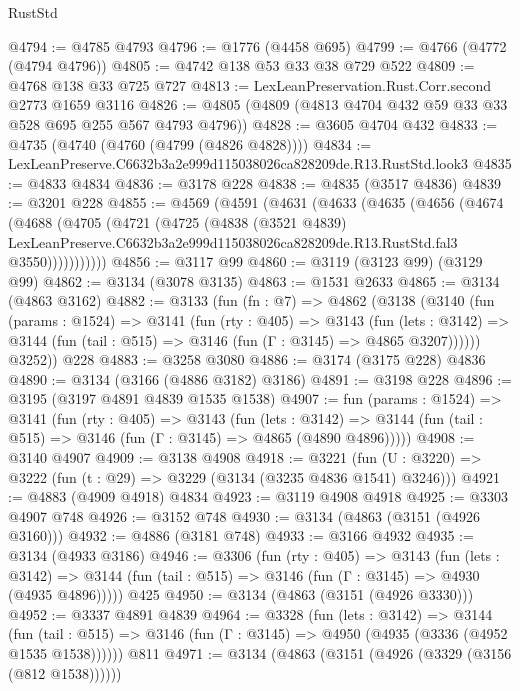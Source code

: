 \begin{lexlean}{RustStd}
\begin{coremodule}
@4794 := @4785 @4793
@4796 := @1776 (@4458 @695)
@4799 := @4766 (@4772 (@4794 @4796))
@4805 := @4742 @138 @53 @33 @38 @729 @522
@4809 := @4768 @138 @33 @725 @727
@4813 := LexLeanPreservation.Rust.Corr.second @2773 @1659 @3116
@4826 := @4805 (@4809 (@4813 @4704 @432 @59 @33 @33 @528 @695 @255 @567 @4793 @4796))
@4828 := @3605 @4704 @432
@4833 := @4735 (@4740 (@4760 (@4799 (@4826 @4828))))
@4834 := LexLeanPreserve.C6632b3a2e999d115038026ca828209de.R13.RustStd.look3
@4835 := @4833 @4834
@4836 := @3178 @228
@4838 := @4835 (@3517 @4836)
@4839 := @3201 @228
@4855 := @4569
    (@4591
      (@4631
        (@4633
          (@4635
            (@4656
              (@4674
                (@4688
                  (@4705
                    (@4721
                      (@4725
                        (@4838
                          (@3521 @4839)
                          LexLeanPreserve.C6632b3a2e999d115038026ca828209de.R13.RustStd.fal3
                          @3550)))))))))))
@4856 := @3117 @99
@4860 := @3119 (@3123 @99) (@3129 @99)
@4862 := @3134 (@3078 @3135)
@4863 := @1531 @2633
@4865 := @3134 (@4863 @3162)
@4882 := @3133
    (fun (fn : @7) =>
    @4862
      (@3138
        (@3140
          (fun (params : @1524) =>
          @3141
            (fun (rty : @405) =>
            @3143
              (fun (lets : @3142) =>
              @3144 (fun (tail : @515) => @3146 (fun (Γ : @3145) => @4865 @3207))))))
        @3252))
    @228
@4883 := @3258 @3080
@4886 := @3174 (@3175 @228) @4836
@4890 := @3134 (@3166 (@4886 @3182) @3186)
@4891 := @3198 @228
@4896 := @3195 (@3197 @4891 @4839 @1535 @1538)
@4907 := fun (params : @1524) =>
  @3141
    (fun (rty : @405) =>
    @3143
      (fun (lets : @3142) =>
      @3144 (fun (tail : @515) => @3146 (fun (Γ : @3145) => @4865 (@4890 @4896)))))
@4908 := @3140 @4907
@4909 := @3138 @4908
@4918 := @3221 (fun (U : @3220) => @3222 (fun (t : @29) => @3229 (@3134 (@3235 @4836 @1541) @3246)))
@4921 := @4883 (@4909 @4918) @4834
@4923 := @3119 @4908 @4918
@4925 := @3303 @4907 @748
@4926 := @3152 @748
@4930 := @3134 (@4863 (@3151 (@4926 @3160)))
@4932 := @4886 (@3181 @748)
@4933 := @3166 @4932
@4935 := @3134 (@4933 @3186)
@4946 := @3306
    (fun (rty : @405) =>
    @3143
      (fun (lets : @3142) =>
      @3144 (fun (tail : @515) => @3146 (fun (Γ : @3145) => @4930 (@4935 @4896)))))
    @425
@4950 := @3134 (@4863 (@3151 (@4926 @3330)))
@4952 := @3337 @4891 @4839
@4964 := @3328
    (fun (lets : @3142) =>
    @3144
      (fun (tail : @515) => @3146 (fun (Γ : @3145) => @4950 (@4935 (@3336 (@4952 @1535 @1538))))))
    @811
@4971 := @3134 (@4863 (@3151 (@4926 (@3329 (@3156 (@812 @1538))))))

\end{coremodule}
\end{lexlean}
